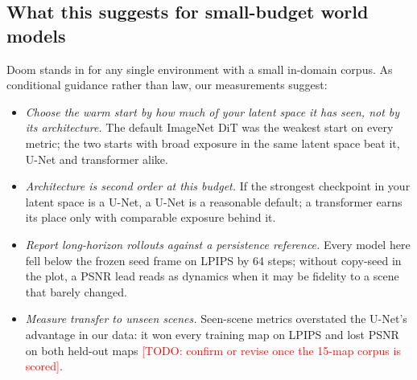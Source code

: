 \documentclass[10pt]{article}
\newcommand{\todo}[1]{\textcolor{red}{[TODO: #1]}}
\begin{document}
\subsection*{What this suggests for small-budget world models}
Doom stands in for any single environment with a small in-domain corpus. As conditional guidance rather than law, our measurements suggest:
\begin{itemize}\setlength{\itemsep}{1pt}
\item \emph{Choose the warm start by how much of your latent space it has seen, not by its architecture.} The default ImageNet DiT was the weakest start on every metric; the two starts with broad exposure in the same latent space beat it, U-Net and transformer alike.
\item \emph{Architecture is second order at this budget.} If the strongest checkpoint in your latent space is a U-Net, a U-Net is a reasonable default; a transformer earns its place only with comparable exposure behind it.
\item \emph{Report long-horizon rollouts against a persistence reference.} Every model here fell below the frozen seed frame on LPIPS by 64 steps; without copy-seed in the plot, a PSNR lead reads as dynamics when it may be fidelity to a scene that barely changed.
\item \emph{Measure transfer to unseen scenes.} Seen-scene metrics overstated the U-Net's advantage in our data: it won every training map on LPIPS and lost PSNR on both held-out maps \todo{confirm or revise once the 15-map corpus is scored}.
\end{itemize}
\end{document}

